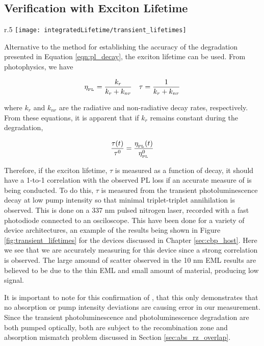 \documentclass[../thesis.tex]{subfiles}
\begin{document}
\subsection{Verification with Exciton Lifetime}\label{sec:lifetime_pl_transients}
\begin{wrapfigure}{r}{.5\textwidth}
\centering
\texttt{[image: integratedLifetime/transient\_lifetimes]}
\caption{Exciton lifetime ratio extracted from transient PL measurements on degraded and undegraded devices as a function of PL degradation for several emissive layer thickness.}
\label{fig:transient_lifetimes}
\end{wrapfigure}


Alternative to the method for establishing the accuracy of the \pl degradation presented in Equation \ref{eqn:pl_decay}, the exciton lifetime can be used.
From photophysics, we have

\begin{align}
\eta_{_\text{\tiny PL}}=\frac{k_r}{k_r+k_{nr}} && \tau=\frac{1}{k_r+k_{nr}}
\label{eqn:tau_pleff}
\end{align}

where $k_r$ and $k_{nr}$ are the radiative and non-radiative decay rates, respectively.
From these equations, it is apparent that if $k_r$ remains constant during the degradation, 

     \[\frac{\tau(t)}{\tau^0}=\frac{\eta_{_\text{\tiny PL}}(t)}{\eta_{_\text{\tiny PL}}^0}\]


Therefore, if the exciton lifetime, $\tau$ is measured as a function of decay, it should have a 1-to-1 correlation with the observed PL loss if an accurate measure of \pl is being conducted.  
To do this, $\tau$ is measured from the transient photoluminescence decay at low pump intensity so that minimal triplet-triplet annihilation is observed. 
This is done on a 337 nm pulsed nitrogen laser, recorded with a fast photodiode connected to an osciloscope.
This have been done for a variety of device architectures, an example of the results being shown in Figure \ref{fig:transient_lifetimes} for the devices discussed in Chapter \ref{sec:cbp_host}.
Here we see that we are accurately measuring \pl for this device since a strong correlation is observed.  
The large amound of scatter observed in the 10 nm EML results are believed to be due to the thin EML and small amount of material, producing low signal.

It is important to note for this confirmation of \pl, that this only demonstrates that no absorption or pump intensity deviations are causing error in our measurement.
Since the transient photoluminescence and photoluminescence degradation are both pumped optically, both are subject to the recombination zone and absorption mismatch problem discussed in Section \ref{sec:abs_rz_overlap}.
\end{document}
